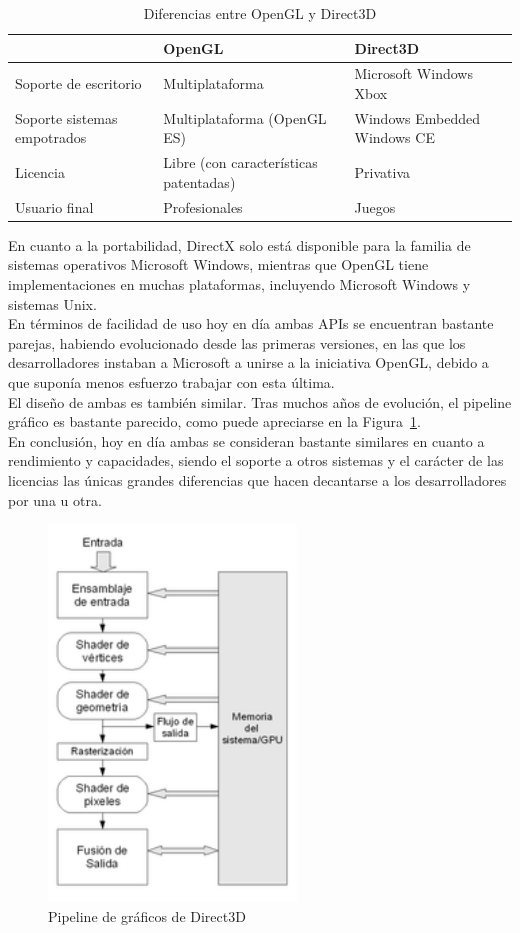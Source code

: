 \begin{table}[h]
	\centering
	\begin{tabular}{ | m{4cm} | m{5cm} | m{5cm} | }
		\hline
		& OpenGL & Direct3D \\
		\hline
		Soporte de escritorio & Multiplataforma & Microsoft Windows Xbox
		\\
		\hline
		Soporte sistemas empotrados & Multiplataforma (OpenGL ES) & Windows
		Embedded Windows CE \\
		\hline
		Licencia & Libre (con características patentadas) & Privativa
		\\
		\hline
		Usuario final & Profesionales & Juegos \\ 
		\hline
	\end{tabular}
	\caption{Diferencias entre OpenGL y Direct3D}
	\label{tabla2.1}
\end{table}

En cuanto a la portabilidad, DirectX solo está disponible para la familia de
sistemas operativos Microsoft Windows, mientras que OpenGL tiene
implementaciones en muchas plataformas, incluyendo Microsoft Windows y sistemas
Unix.\\

En términos de facilidad de uso hoy en día ambas APIs se encuentran bastante
parejas, habiendo evolucionado desde las primeras versiones, en las que los
desarrolladores instaban a Microsoft a unirse a la iniciativa OpenGL, debido a
que suponía menos esfuerzo trabajar con esta última.\\

El diseño de ambas es también similar. Tras muchos años de evolución, el
pipeline gráfico es bastante parecido, como puede apreciarse en la
Figura~\ref{fig2.3}.\\

En conclusión, hoy en día ambas se consideran bastante similares en cuanto a
rendimiento y capacidades, siendo el soporte a otros sistemas y el carácter de
las licencias las únicas grandes diferencias que hacen decantarse a los
desarrolladores por una u otra.\\

\begin{figure}[h]%
	\centering
	\includegraphics[height=10cm]{figures/directxpipeline.png}
	\caption{Pipeline de gráficos de Direct3D}
	\label{fig2.3}
\end{figure}
